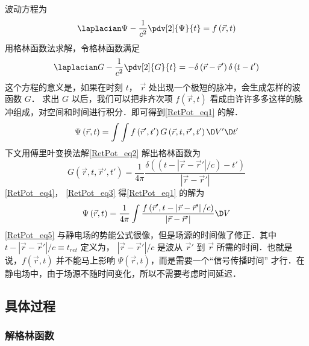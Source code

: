 
波动方程为
\begin{equation}\label{RetPot_eq1}
{\laplacian}\Psi  - \frac{1}{{{c^2}}} \pdv[2]{\Psi}{t} = f\left( {\vec r,t} \right)
\end{equation} 
用格林函数法求解，令格林函数满足
\begin{equation}\label{RetPot_eq2}
{\laplacian}G - \frac{1}{{{c^2}}} \pdv[2]{G}{t} =  - \delta \left( {\vec r - \vec r'} \right)\delta \left( {t - t'} \right)
\end{equation} 
这个方程的意义是，如果在时刻 $t$， $\vec r$ 处出现一个极短的脉冲，会生成怎样的波函数 $G$． 求出 $G$ 以后，我们可以把非齐次项 $f\left( {\vec r,t} \right)$ 看成由许许多多这样的脉冲组成，对空间和时间进行积分．即可得到\autoref{RetPot_eq1} 的解．
\begin{equation}\label{RetPot_eq3}
\Psi \left( {\vec r,t} \right) = \int {\int {f\left( {\vec r',t'} \right)G\left( {\vec r,t,\vec r',t'} \right)\D V'} \D t'} 
\end{equation} 
下文用傅里叶变换法解\autoref{RetPot_eq2} 解出格林函数为
\begin{equation}\label{RetPot_eq4}
G\left( {\vec r,t,\vec r',t'} \right) = \frac{1}{{4\pi }}\frac{{\delta \left( {\left( {t - \left| {\vec r - \vec r'} \right|/c} \right) - t'} \right)}}{{\left| {\vec r - \vec r'} \right|}}
\end{equation} 
\autoref{RetPot_eq4}， \autoref{RetPot_eq3} 得\autoref{RetPot_eq1} 的解为
\begin{equation}\label{RetPot_eq5}
\Psi \left( {\vec r,t} \right) = \frac{1}{{4\pi }}\int {\frac{{f\left( {\vec r',t - \left| {\vec r - \vec r'} \right|/c} \right)}}{{\left| {\vec r - \vec r'} \right|}}\D V} 
\end{equation} 
\autoref{RetPot_eq5} 与静电场的势能公式很像，但是场源的时间做了修正．其中 $t - \left| {\vec r - \vec r'} \right|/c \equiv {t_{ret}}$ 定义为， $\left| {\vec r - \vec r'} \right|/c$ 是波从 $\vec r'$ 到 $\vec r$ 所需的时间．也就是说，$f\left( {\vec r,t} \right)$ 并不能马上影响 $\Psi \left( {\vec r,t} \right)$，而是需要一个“信号传播时间” 才行．在静电场中，由于场源不随时间变化，所以不需要考虑时间延迟．

\subsection{具体过程}

\subsubsection{解格林函数}  

